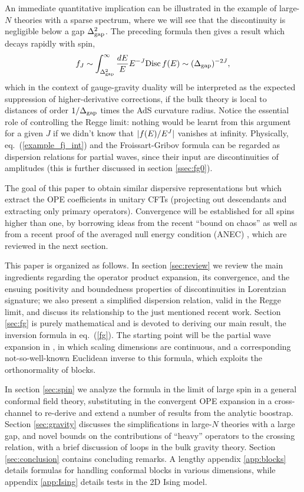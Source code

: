 \documentclass[11pt, reqno,preprint]{article}
\def\be{\begin{equation}}
\def\ee{\end{equation}}
\def\j{J}
\begin{document}
An immediate quantitative implication can be illustrated in the example of large-$N$ theories with a sparse spectrum,
where we will see that the discontinuity is negligible below a gap $\Delta^2_{\rm gap}$.
The preceding formula then gives a result which decays rapidly with spin,
\be
 \Mi_\j \sim  \int_{\Delta_{\rm gap}^2}^\infty \frac{dE}{E}E^{-\j} {\rm Disc}\,\Mi(E) \sim (\Delta_{\rm gap})^{-2\j},
\ee
which in the context of gauge-gravity duality will be interpreted as the expected suppression of higher-derivative corrections,
if the bulk theory is local to distances of order $1/\Delta_{\rm gap}$ times the AdS curvature radius.
Notice the essential role of controlling the Regge limit:
nothing would be learnt from this argument for a given $\j$ if we didn't know that $|\Mi(E)/E^{\j}|$ vanishes at infinity.
Physically, eq.~(\ref{example_fj_int}) and the Froissart-Gribov formula can be regarded as dispersion relations for partial waves,
since their input are discontinuities of amplitudes (this is further discussed in section \ref{ssec:fg0}).

The goal of this paper to obtain similar dispersive representations but which extract
the OPE coefficients in unitary CFTs (projecting out descendants and extracting only primary operators).
Convergence will be established for all spins higher than one, by borrowing
ideas from the recent ``bound on chaos'' as well as from a recent
proof of the averaged null energy condition (ANEC) \cite{Maldacena:2015waa,Hartman:2016lgu}, which are reviewed in the next section.

This paper is organized as follows.  In section \ref{sec:review} we review the main ingredients regarding the operator product expansion, its convergence, and the ensuing positivity and boundedness properties of discontinuities in Lorentzian signature; we also
present a simplified dispersion relation, valid in the Regge limit, and discuss its relationship to the just mentioned recent work.
Section \ref{sec:fg} is purely mathematical and is devoted to deriving our main result, the inversion formula in eq.~(\ref{fg}).
The starting point will be the partial wave expansion in \cite{Costa:2012cb}, in which scaling dimensions are continuous,
and a corresponding not-so-well-known Euclidean inverse to this formula, which exploits the orthonormality of blocks.

In section \ref{sec:spin} we analyze the formula in the limit of large spin in a general conformal field theory,
substituting in the convergent OPE expansion in a cross-channel to re-derive and extend a number of results
from the analytic boostrap.
Section \ref{sec:gravity} discusses the simplifications in large-$N$ theories with a large gap,
and novel bounds on the contributions of ``heavy'' operators to the crossing relation,
with a brief discussion of loops in the bulk gravity theory. Section \ref{sec:conclusion} contains concluding remarks.
A lengthy appendix \ref{app:blocks} details formulas for handling conformal blocks in various dimensions,
while appendix \ref{app:Ising} details tests in the 2D Ising model.
\end{document}
